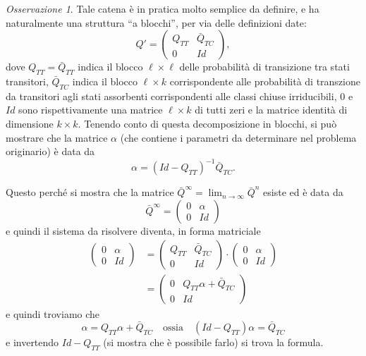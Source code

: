\documentclass[
  italian,
  letterpaper,
]{book}
\newcommand{\bra}[1]{\left( #1 \right)}
\theoremstyle{definition}
\theoremstyle{remark}
\newtheorem*{remark}{Osservazione}
\begin{document}
\begin{remark}
Tale catena è in pratica molto semplice da definire, e ha naturalmente
una struttura ``a blocchi'', per via delle definizioni date:
\[ Q' = \bra{ \begin{array}{cc} Q_{TT} & \bar{Q}_{TC} \\
0 & Id\end{array}},\] dove \(Q_{TT} = \bar{Q}_{TT}\) indica il blocco
\(\ell \times \ell\) delle probabilità di transizione tra stati
transitori, \(\bar{Q}_{TC}\) indica il blocco \(\ell \times k\)
corrispondente alle probabilità di transzione da transitori agli stati
assorbenti corrispondenti alle classi chiuse irriducibili, \(0\) e
\(Id\) sono rispettivamente una matrice \(\ell \times k\) di tutti zeri
e la matrice identità di dimensione \(k\times k\). Tenendo conto di
questa decomposizione in blocchi, si può mostrare che la matrice
\(\alpha\) (che contiene i parametri da determinare nel problema
originario) è data da \[ \alpha = (Id-Q_{TT})^{-1} \bar{Q}_{TC}.\]

Questo perché si mostra che la matrice
\(\bar{Q}^\infty = \lim_{n \to \infty} \bar{Q}^n\) esiste ed è data da
\[ \bar Q^\infty = \bra{ \begin{array}{cc} 0 & \alpha \\
0 & Id\end{array}}\] e quindi il sistema da risolvere diventa, in forma
matriciale \[ \begin{split} \bra{ \begin{array}{cc} 0 & \alpha \\
0 & Id\end{array}} & =  \bra{ \begin{array}{cc} Q_{TT} & \bar{Q}_{TC} \\
0 & Id\end{array}} \cdot \bra{ \begin{array}{cc} 0 & \alpha \\
0 & Id\end{array}} \\
& = \bra{ \begin{array}{cc} 0 & Q_{TT} \alpha +\bar{Q}_{TC}\\
0 & Id\end{array}}\end{split}\] e quindi troviamo che
\[ \alpha = Q_{TT} \alpha + \bar{Q}_{TC} \quad \text{ossia} \quad (Id-Q_{TT}) \alpha = \bar{Q}_{TC}\]
e invertendo \(Id-Q_{TT}\) (si mostra che è possibile farlo) si trova la
formula.
\end{remark}
\end{document}
